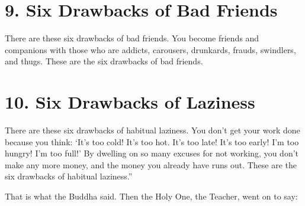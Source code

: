\documentclass[12pt,openany]{book}%
\begin{document}
\section*{9. Six Drawbacks of Bad Friends }

There are these six drawbacks of bad friends. You become friends and companions with those who are addicts, carousers, drunkards, frauds, swindlers, and thugs. These are the six drawbacks of bad friends. 

\section*{10. Six Drawbacks of Laziness }

There are these six drawbacks of habitual laziness. You don’t get your work done because you think: ‘It’s too cold! It’s too hot. It’s too late! It’s too early! I’m too hungry! I’m too full!’ By dwelling on so many excuses for not working, you don’t make any more money, and the money you already have runs out. These are the six drawbacks of habitual laziness.” 

That is what the Buddha said. Then the Holy One, the Teacher, went on to say: 
\end{document}
